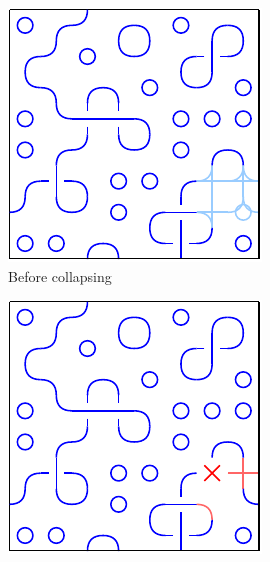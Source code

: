 \begin{figure}
    \begin{subfigure}{0.31\textwidth}
        \includegraphics[width=\linewidth]{img/WFC backtracking before.pdf}
        \caption{Before collapsing} \label{fig:wfc-before-backtracking}
    \end{subfigure}%
    \hspace*{\fill}
    \begin{subfigure}{0.31\textwidth}
        \includegraphics[width=\linewidth]{img/WFC backtracking dead end.pdf}

\end{subfigure}
\end{figure}
